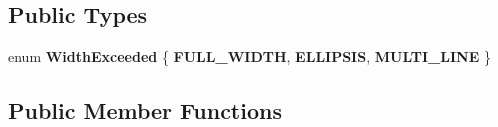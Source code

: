 \subsection*{Public Types}
\begin{DoxyCompactItemize}
\item 
enum {\bfseries Width\+Exceeded} \{ {\bfseries F\+U\+L\+L\+\_\+\+W\+I\+D\+TH}, 
{\bfseries E\+L\+L\+I\+P\+S\+IS}, 
{\bfseries M\+U\+L\+T\+I\+\_\+\+L\+I\+NE}
 \}\hypertarget{classPaintText_ab2b65117f8f2b89bdd14cb72874807e2}{}\label{classPaintText_ab2b65117f8f2b89bdd14cb72874807e2}

\end{DoxyCompactItemize}
\subsection*{Public Member Functions}
